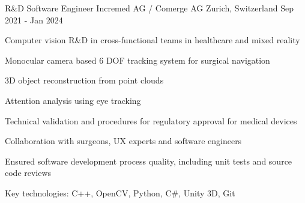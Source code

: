 

\begin{cventries}

  \cventry
    {R\&D Software Engineer} %
    {Incremed AG / Comerge AG} %
    {Zurich, Switzerland} %
    {Sep 2021 - Jan 2024} %
    {
      \begin{cvitems} %
        \item {Computer vision R\&D in cross-functional teams in healthcare and mixed reality}
        \item {Monocular camera based 6 DOF tracking system for surgical navigation}
        \item {3D object reconstruction from point clouds}
        \item {Attention analysis using eye tracking}
        \item {Technical validation and procedures for regulatory approval for medical devices}
        \item {Collaboration with surgeons, UX experts and software engineers}
        \item {Ensured software development process quality, including unit tests and source code reviews}        
        \item {Key technologies: C++, OpenCV, Python, C\#, Unity 3D, Git}
      \end{cvitems}
    }


\end{cventries}
